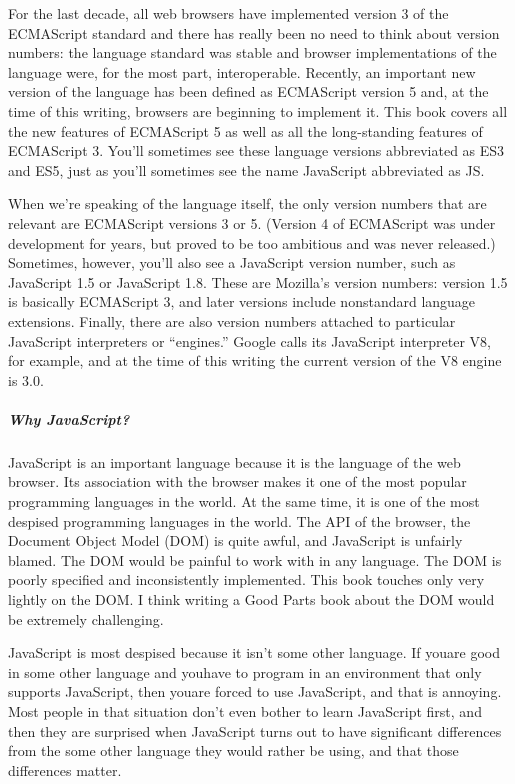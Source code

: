 For the last decade, all web browsers have implemented version 3 of the ECMAScript
standard and there has really been no need to think about version numbers: the language
standard was stable and browser implementations of the language were, for the
most part, interoperable. Recently, an important new version of the language has been
defined as ECMAScript version 5 and, at the time of this writing, browsers are beginning
to implement it. This book covers all the new features of ECMAScript 5 as well as all
the long-standing features of ECMAScript 3. You’ll sometimes see these language versions
abbreviated as ES3 and ES5, just as you’ll sometimes see the name JavaScript
abbreviated as JS.


When we’re speaking of the language itself, the only version numbers that are relevant
are ECMAScript versions 3 or 5. (Version 4 of ECMAScript was under development
for years, but proved to be too ambitious and was never released.) Sometimes, however,
you’ll also see a JavaScript version number, such as JavaScript 1.5 or JavaScript 1.8.
These are Mozilla’s version numbers: version 1.5 is basically ECMAScript 3, and later
versions include nonstandard language extensions. Finally, there are
also version numbers attached to particular JavaScript interpreters or “engines.” Google
calls its JavaScript interpreter V8, for example, and at the time of this writing the
current version of the V8 engine is 3.0.


\subparagraph*{Why JavaScript?}
\hfill \break
JavaScript is an important language because it is the language of the web browser. Its
association with the browser makes it one of the most popular programming languages
in the world. At the same time, it is one of the most despised programming
languages in the world. The API of the browser, the Document Object Model
(DOM) is quite awful, and JavaScript is unfairly blamed. The DOM would be painful
to work with in any language. The DOM is poorly specified and inconsistently
implemented. This book touches only very lightly on the DOM. I think writing a
Good Parts book about the DOM would be extremely challenging.


JavaScript is most despised because it isn’t some other language. If youare good in
some other language and youhave to program in an environment that only supports
JavaScript, then youare forced to use JavaScript, and that is annoying. Most people
in that situation don’t even bother to learn JavaScript first, and then they are surprised
when JavaScript turns out to have significant differences from the some other
language they would rather be using, and that those differences matter.


